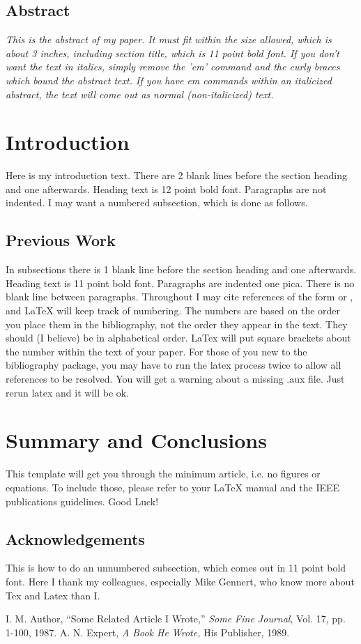 \subsection*{\centering Abstract}
{\em
This is the abstract of my paper.  It must fit within the 
size allowed, which is about 3 inches, including section 
title, which is 11 point bold font.  If you don't want 
the text in italics, simply remove the 'em' command and 
the curly braces which bound the abstract text.  If you 
have em commands within an italicized abstract, the text 
will come out as normal (non-italicized) text. 
}
\section{Introduction}
Here is my introduction text.  There are 2 blank lines 
before the section heading and one afterwards.  Heading 
text is 12 point bold font.  Paragraphs are not indented. 
I may want a numbered subsection, which is done as 
follows.
\subsection{Previous Work}
In subsections there is 1 blank line before the section 
heading and one afterwards.  Heading text is 11 point 
bold font.  Paragraphs are indented one pica.  There is 
no blank line between paragraphs.
Throughout I may cite references of the form 
\cite{key:foo} or \cite{foo:baz}, and LaTeX will keep 
track of numbering.  The numbers are based on the order 
you place them in the bibliography, not the order they 
appear in the text.  They should (I believe) be in 
alphabetical order.  LaTex will put square brackets about 
the number within the text of your paper.  For those of 
you new to the bibliography package, you may have to run 
the latex process twice to allow all references to be 
resolved. You will get a warning about a missing .aux 
file.  Just rerun latex and it will be ok.
\section{Summary and Conclusions}
This template will get you through the minimum article, 
i.e. no figures or equations.  To include those, please 
refer to your LaTeX manual and the IEEE publications 
guidelines.  Good Luck!
\subsection*{Acknowledgements}
This is how to do an unnumbered subsection, which comes 
out in 11 point bold font.  Here I thank my colleagues, 
especially Mike Gennert, who know more about Tex and 
Latex than I.
\begin{thebibliography}{9}
I. M. Author,
``Some Related Article I Wrote,''
{\em Some Fine Journal}, Vol. 17, pp. 1-100, 1987.
A. N. Expert,
{\em A Book He Wrote,}
His Publisher, 1989.
\end{thebibliography}


